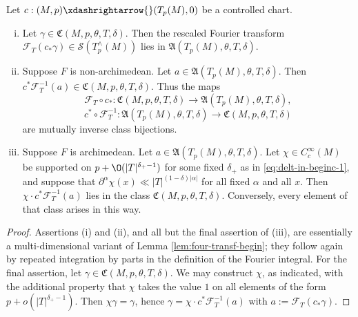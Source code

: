 \begin{lemma}\label{lem:let-c-frakC-vs-frakA}
  Let $c : (M,p) \xdashrightarrow{} (T_p(M), 0)$ be a controlled chart.
  \begin{enumerate}[(i)]
  \item Let $\gamma \in \mathfrak{C}(M,p,\theta,T,\delta)$.  Then the rescaled Fourier transform $\mathcal{F}_T(c_*\gamma) \in \mathcal{S}(T_p^\wedge(M))$ lies in $\mathfrak{A}(T_p(M),\theta,T,\delta)$.
  \item Suppose $F$ is non-archimedean.   Let $a \in \mathfrak{A}(T_p(M),\theta,T,\delta)$.  Then $c^* \mathcal{F}_T^{-1}(a) \in \mathfrak{C}(M,p,\theta,T,\delta)$.  Thus the maps
    \begin{equation*}
      \mathcal{F}_T \circ c_* : \mathfrak{C}(M,p,\theta,T,\delta) \rightarrow \mathfrak{A}(T_p(M),\theta,T,\delta),
    \end{equation*}
    \begin{equation*}
      c^* \circ \mathcal{F}_T^{-1}  : \mathfrak{A}(T_p(M),\theta,T,\delta) \rightarrow \mathfrak{C}(M,p,\theta,T,\delta)
    \end{equation*}
    are mutually inverse class bijections.
  \item \label{itm:standard:fourier-description-of-bumps-arch} Suppose $F$ is archimedean.  Let $a \in \mathfrak{A}(T_p(M),\theta,T,\delta)$.  Let $\chi \in C_c^\infty(M)$ be supported on $p + \O(|T|^{\delta_+-1})$ for some fixed $\delta_+$ as in \eqref{eq:delt-in-beginc-1}, and suppose that $\partial^\alpha \chi(x) \ll |T|^{(1 - \delta) |\alpha|}$ for all fixed $\alpha$ and all $x$.  Then $\chi \cdot c^* \mathcal{F}_T^{-1}(a)$ lies in the class $\mathfrak{C}(M,p,\theta,T,\delta)$.  Conversely, every element of that class arises in this way.
  \end{enumerate}
\end{lemma}
\begin{proof}
  Assertions (i) and (ii), and all but the final assertion of (iii), are essentially a multi-dimensional variant of Lemma \ref{lem:four-transf-begin}; they follow again by repeated integration by parts in the definition of the Fourier integral.  For the final assertion, let $\gamma \in \mathfrak{C}(M,p,\theta,T,\delta)$.  We may construct $\chi$, as indicated, with the additional property that $\chi$ takes the value $1$ on all elements of the form $p + o(|T|^{\delta_+-1})$.  Then $\chi \gamma = \gamma$, hence $\gamma = \chi \cdot c^* \mathcal{F}_T^{-1} (a)$ with $a := \mathcal{F}_T (c_* \gamma)$.
\end{proof}

